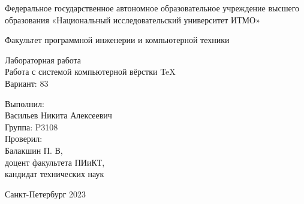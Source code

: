 \thispagestyle{empty}
\begin{center}
    Федеральное государственное автономное образовательное учреждение высшего образования «Национальный исследовательский университет ИТМО»

    \vspace{1em}
    Факультет программной инженерии и компьютерной техники

    \vspace{20em}
    {\Large Лабораторная работа }\\[1em]
    {\Large {Работа с системой компьютерной вёрстки \TeX}}\\[1em]
    {\Large Вариант: 83}\\[1em]
\end{center}

\vspace{12em}

\begin{flushright}
    Выполнил: \\
    Васильев Никита Алексеевич \\
    Группа: P3108\\
    \vspace{1em}
    Проверил: \\
    Балакшин П. В, \\ доцент факультета ПИиКТ, \\ кандидат технических наук \\
\end{flushright}
\vspace{10em}
\vspace{\fill}

\begin{center}
Санкт-Петербург 2023
\end{center}
